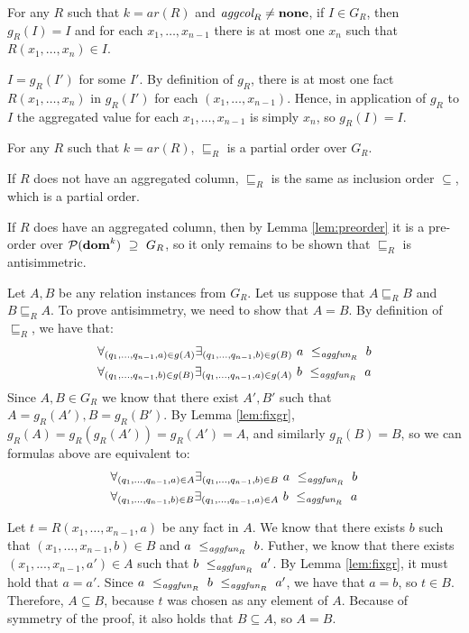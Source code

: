 \begin{lem}
For any $R$ such that $k=ar(R)$ and $\textit{aggcol}_R \ne {\bf none}$, if $I \in G_R$, then $g_R(I) = I$ and for each $x_1, \dots, x_{n-1}$ there is at most one $x_n$ such that $R(x_1, \dots, x_n) \in I$.
\end{lem}\label{lem:fixgr}

\begin{prof}
$I = g_R(I')$ for some $I'$. By definition of $g_R$, there is at most one fact $R(x_1, \dots, x_n)$ in $g_R(I')$ for each $(x_1, \dots, x_{n-1})$. Hence, in application of $g_R$ to $I$ the aggregated value for each $x_1, \dots, x_{n-1}$ is simply $x_n$, so $g_R(I) = I$.
\end{prof}

\begin{lem}
For any $R$ such that $k=ar(R)$, $\sqsubseteq_R$ is a partial order over $G_R$.
\end{lem}

\begin{prof}

If $R$ does not have an aggregated column, $\sqsubseteq_R$ is the same as inclusion order $\subseteq$, which is a partial order.

If $R$ does have an aggregated column, then by Lemma \ref{lem:preorder} it is a pre-order over $\mathcal{P}({\bf dom}^k)~\supseteq~G_R$, so it only remains to be shown that $\sqsubseteq_R$ is antisimmetric.

Let $A, B$ be any relation instances from $G_R$. Let us suppose that $A \sqsubseteq_R B$ and $B \sqsubseteq_R A$. To prove antisimmetry, we need to show that $A = B$. By definition of $\sqsubseteq_R$, we have that:
\begin{align*}
\forall_{(q_1, ..., q_{n-1}, a) \in g(A)} \exists_{(q_1, ..., q_{n-1}, b) \in g(B)}~a~\le_{\textit{aggfun}_R}~b \\
\forall_{(q_1, ..., q_{n-1}, b) \in g(B)} \exists_{(q_1, ..., q_{n-1}, a) \in g(A)}~b~\le_{\textit{aggfun}_R}~a
\end{align*}
Since $A, B \in G_R$ we know that there exist $A', B'$ such that $A = g_R(A'), B = g_R(B')$. By Lemma \ref{lem:fixgr}, $g_R(A) = g_R(g_R(A')) = g_R(A') = A$, and similarly $g_R(B) = B$, so we can formulas above are equivalent to:
\begin{align*}
\forall_{(q_1, ..., q_{n-1}, a) \in A} \exists_{(q_1, ..., q_{n-1}, b) \in B}~a~\le_{\textit{aggfun}_R}~b \\
\forall_{(q_1, ..., q_{n-1}, b) \in B} \exists_{(q_1, ..., q_{n-1}, a) \in A}~b~\le_{\textit{aggfun}_R}~a
\end{align*}

Let $t = R(x_1, \dots, x_{n-1}, a)$ be any fact in $A$. We know that there exists $b$ such that $(x_1, ..., x_{n-1}, b) \in B$ and $a~\le_{\textit{aggfun}_R}~b$. Futher, we know that there exists $(x_1, ..., x_{n-1}, a') \in A$ such that $b~\le_{\textit{aggfun}_R}~a'$. By Lemma \ref{lem:fixgr}, it must hold that $a = a'$. Since $a~\le_{\textit{aggfun}_R}~b~\le_{\textit{aggfun}_R}~a'$, we have that $a = b$, so $t \in B$. Therefore, $A \subseteq B$, because $t$ was chosen as any element of $A$. Because of symmetry of the proof, it also holds that $B \subseteq A$, so $A = B$.

\end{prof}


